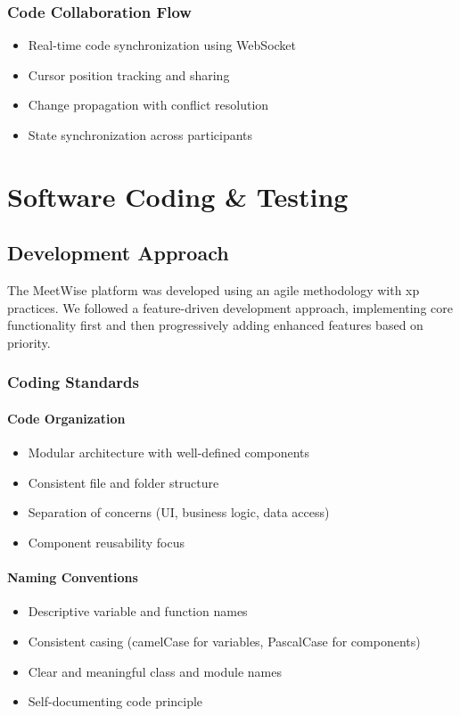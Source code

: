 \documentclass[12pt,a4paper]{report}
\begin{document}
\subsection{Code Collaboration Flow}
\begin{itemize}
   \item Real-time code synchronization using WebSocket
   \item Cursor position tracking and sharing
   \item Change propagation with conflict resolution
   \item State synchronization across participants
\end{itemize}

\chapter{Software Coding \& Testing}

\section{Development Approach}
The MeetWise platform was developed using an agile methodology with xp practices. We followed a feature-driven development approach, implementing core functionality first and then progressively adding enhanced features based on priority.

\subsection{Coding Standards}
\subsubsection{Code Organization}
\begin{itemize}
   \item Modular architecture with well-defined components
   \item Consistent file and folder structure
   \item Separation of concerns (UI, business logic, data access)
   \item Component reusability focus
\end{itemize}

\subsubsection{Naming Conventions}
\begin{itemize}
   \item Descriptive variable and function names
   \item Consistent casing (camelCase for variables, PascalCase for components)
   \item Clear and meaningful class and module names
   \item Self-documenting code principle
\end{itemize}
\end{document}
